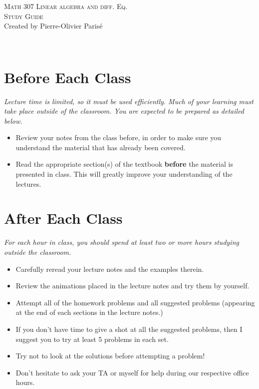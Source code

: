 \documentclass[12pt]{amsart}
\begin{document}
\thispagestyle{empty}

\noindent\hrulefill
\begin{center}
\Large{\textsc{Math 307 Linear algebra and diff. Eq. }}\\
\textsc{Study Guide}\\
\small{Created by Pierre-Olivier Paris{\'e}}
\end{center}
\hrulefill \\

\section*{Before Each Class}
\textit{Lecture time is limited, so it must be used efficiently. Much of your learning must take place outside of the classroom. You are expected to be prepared as detailed below.}
	\begin{itemize}
	\item Review your notes from the class before, in order to make sure you understand the material that has already been covered.
	\item Read the appropriate section(s) of the textbook \textbf{before} the material is presented in class. This will greatly improve your understanding of the lectures.
	\end{itemize}
	
\section*{After Each Class}
\textit{For each hour in class, you should spend at least two or more hours studying outside the classroom.}
	\begin{itemize}
	\item Carefully reread your lecture notes and the examples therein.
	\item Review the animations placed in the lecture notes and try them by yourself. 
	\item Attempt all of the homework problems and all suggested problems (appearing at the end of each sections in the lecture notes.)
	\item If you don't have time to give a shot at all the suggested problems, then I suggest you to try at least 5 problems in each set.
	\item Try not to look at the solutions before attempting a problem!
	\item Don't hesitate to ask your TA or myself for help during our respective office hours.
	\end{itemize}
	
\end{document}
